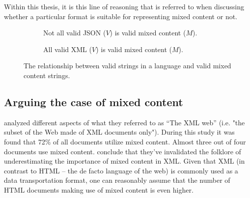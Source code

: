 \documentclass{scrreprt}
\begin{document}
Within this thesis, it is this line of reasoning that is referred to when discussing whether a particular format is suitable for representing mixed content or not.



\begin{figure}
\centering
\begin{subfigure}{.4\textwidth}
  \centering

  \caption{Not all valid JSON ($V$) is valid mixed content ($M$).}
  \label{fig:mixed-content-venn-json}
  
\end{subfigure}%
\begin{subfigure}{.4\textwidth}
  \centering

  \caption{All valid XML ($V$) is valid mixed content ($M$).}
  \label{fig:mixed-content-venn-json}
  
\end{subfigure}
\caption{The relationship between valid strings in a language and valid mixed content strings.}
\label{fig:mixed-content-venn}
\end{figure}









\subsection{Arguing the case of mixed content}
\citet*{mignet} analyzed different aspects of what they referred to as ``The XML web'' (i.e. "the subset of the Web made of XML documents only"). During this study it was found that 72\% of all documents utilize mixed content. Almost three out of four documents use mixed content. \citet{mignet} conclude that they've invalidated the folklore of underestimating the importance of mixed content in XML. Given that XML (in contrast to HTML -- the de facto language of the web) is commonly used as a data transportation format, one can reasonably assume that the number of HTML documents making use of mixed content is even higher.
\end{document}

